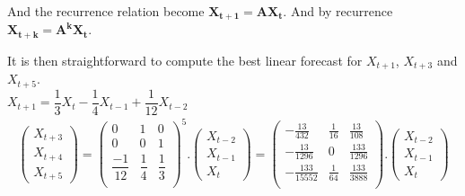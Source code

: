 \documentclass{article}
\begin{document}
And the recurrence relation become $\pmb{X_{t+1}}=\pmb{A X_{t}}$. And by recurrence $\pmb{X_{t+k}}=\pmb{A^k X_{t}}$.

It is then straightforward to compute the best linear forecast for $X_{t+1}$, $X_{t+3}$ and $X_{t+5}$. \\

$X_{t+1}=\dfrac{1}{3}X_{t}-\dfrac{1}{4}X_{t-1}+\dfrac{1}{12}X_{t-2}$
\begin{align*}
\begin{pmatrix}
X_{t+3} \\
X_{t+4} \\
X_{t+5}
\end{pmatrix}
=
\begin{pmatrix}
0&1&0 \\
0&0&1 \\
\dfrac{-1}{12} & \dfrac{1}{4} & \dfrac{1}{3} \\
\end{pmatrix}^5
.
\begin{pmatrix}
X_{t-2} \\
X_{t-1} \\
X_{t}
\end{pmatrix}=
\begin{pmatrix}
 -\frac{13}{432} & \frac{1}{16} & \frac{13}{108} \\
 -\frac{13}{1296} & 0 & \frac{133}{1296} \\
 -\frac{133}{15552} & \frac{1}{64} & \frac{133}{3888} \\
\end{pmatrix}
.
\begin{pmatrix}
X_{t-2} \\
X_{t-1} \\
X_{t}
\end{pmatrix}
\end{align*}
\end{document}
